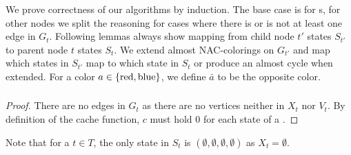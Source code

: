 We prove correctness of our algorithms by induction.
The base case is for \LeafNode{}s, for other nodes we split the reasoning for cases where
there is or is not at least one edge in \( G_t \).
%
Following lemmas always show mapping from child node \( t' \) states \( S_{t'} \)
to parent node \( t \) states \( S_t \).
We extend almost NAC-colorings on \( G_{t'} \) and
map which states in \( S_{t'} \) map to which state in \( S_t \)
or produce an almost cycle when extended.
%
For a color \( a \in \{\text{red}, \text{blue}\} \),
we define \( \bar{a} \) to be the opposite color.

\subsubsection*{\LeafNode{}}

%
\begin{proof}
	There are no edges in \( G_t \) as there are no vertices
	neither in \( X_t \) nor \( V_t \).
	By definition of the cache function,
	\( c \) must hold \( 0 \) for each state of a \LeafNode{}.
\end{proof}
%
Note that for a \LeafNode{} \( t \in T \),
the only state in \( S_t \) is \( (\emptyset, \emptyset, \emptyset, \emptyset) \)
as \( X_t = \emptyset \).

\subsubsection*{\IntroduceVertexNode{}}

